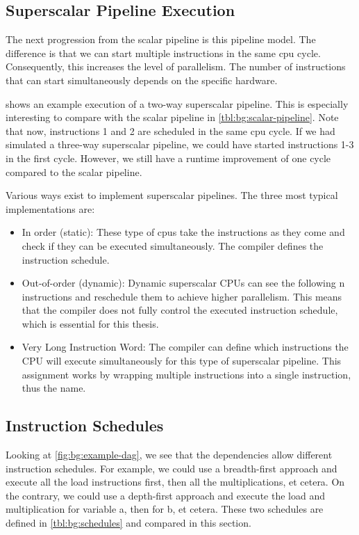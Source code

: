 \subsection{Superscalar Pipeline Execution}
\label{sec:bg:superscalar-cpu}
The next progression from the scalar pipeline is this pipeline model.
The difference is that we can start multiple instructions in the same \ac{cpu} cycle.
Consequently, this increases the level of parallelism.
The number of instructions that can start simultaneously depends on the specific hardware. %

 shows an example execution of a two-way superscalar pipeline.
This is especially interesting to compare with the scalar pipeline in \cref{tbl:bg:scalar-pipeline}.
Note that now, instructions 1 and 2 are scheduled in the same \ac{cpu} cycle.
If we had simulated a three-way superscalar pipeline, we could have started instructions 1-3 in the first cycle.
However, we still have a runtime improvement of one cycle compared to the scalar pipeline.

Various ways exist to implement superscalar pipelines.
The three most typical implementations are:
\begin{itemize}
    \item In order (static): 
        These type of \acp{cpu} take the instructions as they come and check if they can be executed simultaneously.
        The compiler defines the instruction schedule.
    \item Out-of-order (dynamic): 
        Dynamic superscalar CPUs can see the following n instructions and reschedule them to achieve higher parallelism.
        This means that the compiler does not fully control the executed instruction schedule, which is essential for this thesis.
    \item Very Long Instruction Word: 
        The compiler can define which instructions the CPU will execute simultaneously for this type of superscalar pipeline.
        This assignment works by wrapping multiple instructions into a single instruction, thus the name.
\end{itemize}

\subsection{Instruction Schedules}
\label{sec:bg:cpu-schedule}
Looking at \cref{fig:bg:example-dag}, we see that the dependencies allow different instruction schedules.
For example, we could use a breadth-first approach and execute all the load instructions first, then all the multiplications, et cetera.
On the contrary, we could use a depth-first approach and execute the load and multiplication for variable a, then for b, et cetera.
These two schedules are defined in \cref{tbl:bg:schedules} and compared in this section.

